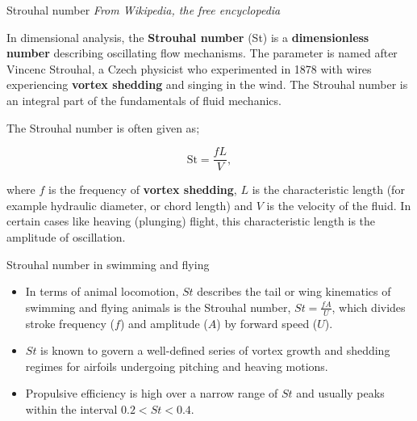\documentclass{beamer}
\begin{document}
\begin{frame}{Strouhal number}
\small
\textit{From Wikipedia, the free encyclopedia}

\medskip

In dimensional analysis, the \textbf{Strouhal number} (St) is a \textbf{dimensionless number} describing oscillating flow mechanisms. The parameter is named after Vincenc Strouhal, a Czech physicist who experimented in 1878 with wires experiencing \textbf{vortex shedding} and singing in the wind. The Strouhal number is an integral part of the fundamentals of fluid mechanics.

\medskip

The Strouhal number is often given as;

\begin{equation*}
\text{St} = \frac{fL}{V},
\end{equation*}

where \(f\) is the frequency of \textbf{vortex shedding}, \(L\) is the characteristic length (for example hydraulic diameter, or chord length) and \(V\) is the velocity of the fluid. In certain cases like heaving (plunging) flight, this characteristic length is the amplitude of oscillation.

\end{frame}

\begin{frame}{Strouhal number in swimming and flying}
\begin{itemize}
\item In terms of animal locomotion, $St$ describes the tail or wing kinematics of swimming and flying animals is the Strouhal number, \( St = \frac{fA}{U} \), which divides stroke frequency (\( f \)) and amplitude (\( A \)) by forward speed (\( U \)).

\item \( St \) is known to govern a well-defined series of vortex growth and shedding regimes for airfoils undergoing pitching and heaving motions.

\item Propulsive efficiency is high over a narrow range of \( St \) and usually peaks within the interval \( 0.2 < St < 0.4 \).
\end{itemize}
\end{frame}
\end{document}
